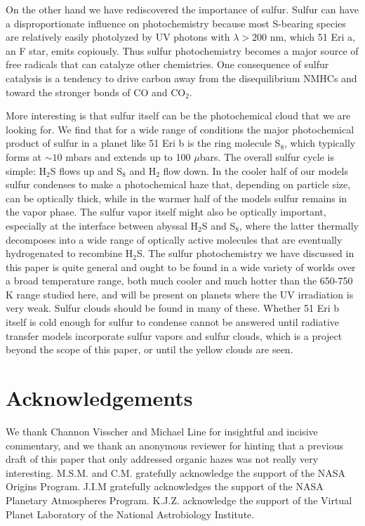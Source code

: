 \documentclass[preprint]{aastex}
\begin{document}
On the other hand we have rediscovered the importance of sulfur. 
Sulfur can have a disproportionate influence on photochemistry
because most S-bearing species are relatively easily photolyzed by 
UV photons with $\lambda > 200$ nm, which 51 Eri a, an F star, emits copiously.
Thus sulfur photochemistry becomes a major source of free radicals that can catalyze other chemistries.
One consequence of sulfur catalysis is a tendency to drive carbon 
away from the disequilibrium NMHCs and toward the stronger bonds of CO and CO$_2$.

More interesting is that sulfur itself can be the photochemical cloud that we are looking for.
We find that for a wide range of conditions the major photochemical product of sulfur in 
a planet like 51 Eri b is the ring molecule S$_8$, which typically forms at $\sim 10$ mbars
and extends up to 100 $\mu$bars.
The overall sulfur cycle is simple: H$_2$S flows up and S$_8$ and H$_2$ flow down.
In the cooler half of our models sulfur condenses to make a photochemical haze that, depending on particle size,
can be optically thick, while in the warmer half of the models sulfur remains in the vapor phase.
The sulfur vapor itself might also be optically important, especially at the interface between
abyssal H$_2$S and S$_8$, where the latter thermally decomposes into a wide range of optically active
molecules that are eventually hydrogenated to recombine H$_2$S. 
The sulfur photochemistry we have discussed in this paper is quite general and ought to be found
in a wide variety of worlds over a broad temperature range, both much cooler and much hotter
than the 650-750 K range studied here, and will be present on planets where the UV irradiation is very weak.  
Sulfur clouds should be found in many of these.  
Whether 51 Eri b itself is cold enough for sulfur to condense cannot be answered until
radiative transfer models incorporate sulfur vapors and sulfur clouds,
which is a project beyond the scope of this paper, or until the yellow clouds are seen.

\section{Acknowledgements}
We thank Channon Visscher and Michael Line for insightful and incisive commentary, and
we thank an anonymous reviewer for hinting that a previous draft of this paper
 that only addressed organic hazes was not really very interesting.     
M.S.M. and C.M. gratefully acknowledge the support of the NASA Origins Program.
J.I.M gratefully acknowledges the support of the NASA Planetary Atmospheres Program.
K.J.Z. acknowledge the support of the Virtual Planet Laboratory of the National Astrobiology Institute.
\end{document}
